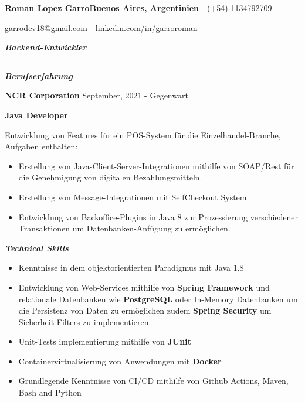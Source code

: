 \documentclass{article}
\begin{document}
\fontsize{18pt}{0pt}
\noindent\textbf{Roman Lopez Garro}\hfill\fontsize{10pt}{0pt}\textbf{Buenos Aires, Argentinien} - (+54) 1134792709

\hfill garrodev18@gmail.com - linkedin.com/in/garroroman

\vspace{1mm}

\fontsize{13pt}{0pt}
\noindent\textit{\textbf{Backend-Entwickler}}
\par\noindent\rule{\textwidth}{0.4pt}

\vspace{4mm}
\fontsize{12pt}{0pt}
\begin{center}
    \textit{\textbf{Berufserfahrung}}
\end{center}

\vspace{1mm}
\setlength{\parindent}{11pt}\fontsize{10pt}{0pt}\textbf{NCR Corporation} \hfill September, 2021 - Gegenwart

\vspace{1mm}
\setlength{\parindent}{11pt}\fontsize{10pt}{0pt}\textbf{Java Developer}

\vspace{4mm}
\indent Entwicklung von Features für ein POS-System für die Einzelhandel-Branche, Aufgaben enthalten:
\begin{itemize}
    \item Erstellung von Java-Client-Server-Integrationen mithilfe von SOAP/Rest für die Genehmigung von digitalen Bezahlungsmitteln.
    \item Erstellung von Message-Integrationen mit SelfCheckout System.
    \item Entwicklung von Backoffice-Plugins in Java 8 zur Prozessierung verschiedener Transaktionen um Datenbanken-Anfügung zu ermöglichen.

\end{itemize}

\vspace{4mm}
\fontsize{12pt}{0pt}
\begin{center}
    \textit{\textbf{Technical Skills}}
\end{center}

\fontsize{9pt}{0pt}
\noindent
\begin{itemize}
    \item Kenntnisse in dem objektorientierten Paradigmus mit Java 1.8
    \item Entwicklung von Web-Services mithilfe von \textbf{Spring Framework} und relationale Datenbanken wie \textbf{PostgreSQL} oder In-Memory Datenbanken um die Persistenz von Daten zu ermöglichen zudem \textbf{Spring Security} um Sicherheit-Filters zu implementieren.
    \item Unit-Tests implementierung mithilfe von \textbf{JUnit}
    \item Containervirtualisierung von Anwendungen mit \textbf{Docker}
    \item Grundlegende Kenntnisse von CI/CD mithilfe von Github Actions, Maven, Bash and Python
\end{itemize}
\end{document}
